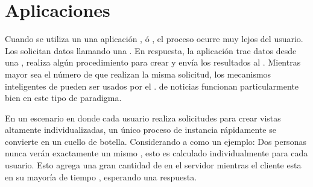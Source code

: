 \begin{itemize}
			
	\end{itemize}

\section{Aplicaciones \webINT}\label{cap:estadoArte:section:web_app}

Cuando se utiliza un \backendAS \running una aplicación \javaNAME, \phpNAME ó \rails, el proceso ocurre muy lejos del usuario. Los \clientsAS solicitan datos llamando una \uri. En respuesta, la aplicación trae datos desde una \dataBaseDB, realiza algún procedimiento para crear \htmlNAME y envía los resultados al \clientAS. Mientras mayor sea el número de \clientsAS que realizan la misma solicitud, los mecanismos inteligentes de \caching pueden ser usados por el \serverAS. \sites de noticias funcionan particularmente bien en este tipo de paradigma.

En un escenario en donde cada usuario realiza solicitudes para crear vistas altamente individualizadas, un único proceso de instancia rápidamente se convierte en un cuello de botella. Considerando a \facebook como un ejemplo: Dos personas nunca verán exactamente un mismo \facebookwall, esto es calculado individualmente para cada usuario. Esto agrega una gran cantidad de \stress en el servidor mientras el cliente esta en su mayoría de tiempo \idle, esperando una respuesta.

